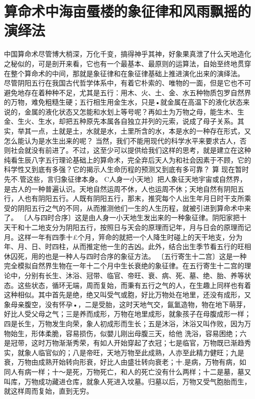 {{\section{算命术中海亩蜃楼的象征律和风雨飘摇的演绎法}
中国算命术尽管博大梢深，万化千变，搞得神乎其神，好象果真泄了什么天地造化之秘似的，可是剖开来看，它也有一个最基本、最原则的运算法，自始至终地贯穿在整个算命术的中间，那就是象征律和在象征律基础上推进演化出来的演绎法。
尽管阴阳五行在我国古代哲学体系中，有着它朴索的、唯物的一面，但是它也不可避免地存在着种种不足，尤其是五行：用木、火、土、金、水五种物质包罗自然界的万物，难免粗糙生硬；五行相生用金生水，只是•就金属在高温下的液化状态来说的，金属的液化状态又怎能和水划上等号呢？再如土为万物之母，能生木、生金、生火、生水，却把五种原先本属各自独立并列的元索，说成了母子关系。其实，举其一点，土就是土，水就是水，土里所含的水，本是水的一种存在形式，又怎么能认为是水生出来的呢？
当然，我们不能用现代的科学水平来要求古人，否则社会就没有前进了。不过，这至少可以提供给我们这样的思考，就是建立在这种纯看生辰八字五行理论基础上的算命术，完全弃后天人为和社会因素于不顾，它的科学性又到底有多强？它的揭示人生命历程的预测又到底有多可靠？
算
现在暂时先不.管这些，言归象征律本身。
C人身一小天地〕把人象征天地宇宙或自然界，是古人的一种普遍认识。天地自然运周不休，人也运周不休；天地自然有阴阳五行，人也有阴阳五行。人既有阴阳五行，那末，推究每个人出生年月日时干支所乘受的阴阳五行之气的不同，从而推测他们一生的人生历程，就被引进到算命术中来了。
〔人与四时合序〕这是由人身一小天地生发出来的一种象征律。阴阳家把十天干和十二地支分为阴阳五行，按照日与天会的原理而记年，月与日会的原理而记月。这样一年有四季十£个月，笄命的就把一个人降生时碰上的天干地支，分为年、月、日、时四柱，从而推定他一生的吉凶。此外，结合出生季节看五行的旺相休囚死，用的也是一种人与四时合序的象征方法。
〔五行寄生十二宫〕这是一种完全模拟自然界生物在一年十二个月中生长衰绝的象征律。在五行寄生十二宫的理论中，分别有长生、沐浴、冠带、临官、帝旺、衰、病、死、墓、绝、胎、养等状态。这些状态，循环无端，周而复始，而秉有五行之气的人，在生趣上同样也有着这种相似。其中首先是绝，绝又叫受气或胞，好比万物处在地里，还没有成形，又象母亲腹空，没有怀孕•，二是受胎，这时天地气交，氤氳造物，物在地下萌芽，好比人受父母之气；三是养而成形，万物在地里成形，就象孩子在母腹成形一样；四是长生，万物发生向荣，象人初成形而生长；五是沐浴，沐浴又叫作败，因为万物始生，形体柔脆，容易损伤，似嬰儿刚出母腹三天，给他
洗浴，容易困绝；六是冠带，这时万物渐渐秀荣，有如人开始穿起了衣冠；七是临官，万物既已渐趋秀实，就象人临官似的；八是帝旺，天地万物至此成熟，人亦至此精力健旺；九是衰，万物由成熟开始转向形衰，好比人由盛壮转向衰老；十.是病，万物有病，如同人有病一样；十〜是死，万物死亡，和人的死亡没有什么两样；十二是墓，墓又叫库，万物成功藏进仓库，就象人死进入坟墓。归墓以后，万物又受气胞胎而生，就这样周而复始，直到无穷。
}}
